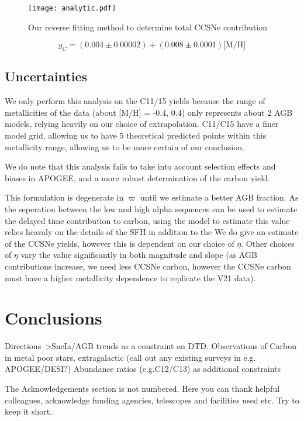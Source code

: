 \documentclass[12pt,oneside]{book}
\begin{document}
\begin{figure}
    \centering
    \texttt{[image: analytic.pdf]}
    \caption{Our reverse fitting method to determine total CCSNe contribution}
\end{figure}

\begin{equation}
    y_C = (0.004 \pm 0.00002) + (0.008 \pm 0.0001) \text{[M/H]} 
\end{equation}

\section{Uncertainties}

We only perform this analysis on the C11/15 yields because the range of metallicities of the data (about [M/H] = -0.4, 0.4) only represents about 2 AGB models, relying heavily on our choice of extrapolation. C11/C15 have a finer model grid, allowing us to have 5 theoretical predicted points within this metallicity range, allowing us to be more certain of our conclusion. 

We do note that this analysis fails to take into account selection effects and biases in APOGEE, and a more robust determination of the carbon yield. 


This formulation is degenerate in $\varpi$ until we estimate a better AGB fraction. As the seperation between the low and high alpha sequences can be used to estimate the delayed time contribution to carbon, using the model to estimate this value relies heavaly on the details of the SFH in addition to the 
We do give an estimate of the CCSNe yields, however this is dependent on our choice of $\eta$. Other choices of $\eta$ vary the value significantly in both magnitude and slope (as AGB contributions increase, we need less CCSNe carbon, however the CCSNe carbon must have a higher metallicity dependence to replicate the V21 data). 



\chapter{Conclusions}

Directions-->SneIa/AGB trends as a constraint on DTD.
Observations of Carbon in metal poor stars, extragalactic (call out any
existing surveys in e.g. APOGEE/DESI?)
Abundance ratios (e.g.C12/C13) as additional constraints


The Acknowledgements section is not numbered. Here you can thank helpful
colleagues, acknowledge funding agencies, telescopes and facilities used etc.
Try to keep it short.
\end{document}
